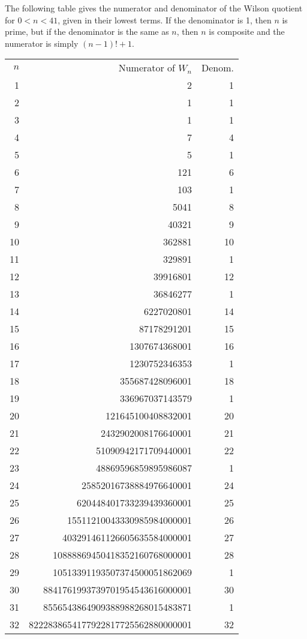 \documentclass[12pt]{article}
\begin{document}
The following table gives the numerator and denominator of the Wilson quotient for $0 < n < 41$, given in their lowest terms. If the denominator is 1, then $n$ is prime, but if the denominator is the same as $n$, then $n$ is composite and the numerator is simply $(n - 1)! + 1$.

\begin{tabular}{|r|r|r|}
$n$ & Numerator of $W_n$ & Denom. \\
1 & 2 & 1 \\
2 & 1 & 1 \\
3 & 1 & 1 \\
4 & 7 & 4 \\
5 & 5 & 1 \\
6 & 121 & 6 \\
7 & 103 & 1 \\
8 & 5041 & 8 \\
9 & 40321 & 9 \\
10 & 362881 & 10 \\
11 & 329891 & 1 \\
12 & 39916801 & 12 \\
13 & 36846277 & 1 \\
14 & 6227020801 & 14 \\
15 & 87178291201 & 15 \\
16 & 1307674368001 & 16 \\
17 & 1230752346353 & 1 \\
18 & 355687428096001 & 18 \\
19 & 336967037143579 & 1 \\
20 & 121645100408832001 & 20 \\
21 & 2432902008176640001 & 21 \\
22 & 51090942171709440001 & 22 \\
23 & 48869596859895986087 & 1 \\
24 & 25852016738884976640001 & 24 \\
25 & 620448401733239439360001 & 25 \\
26 & 15511210043330985984000001 & 26 \\
27 & 403291461126605635584000001 & 27 \\
28 & 10888869450418352160768000001 & 28 \\
29 & 10513391193507374500051862069 & 1 \\
30 & 8841761993739701954543616000001 & 30 \\
31 & 8556543864909388988268015483871 & 1 \\
32 & 8222838654177922817725562880000001 & 32 \\

\end{tabular}
\end{document}
